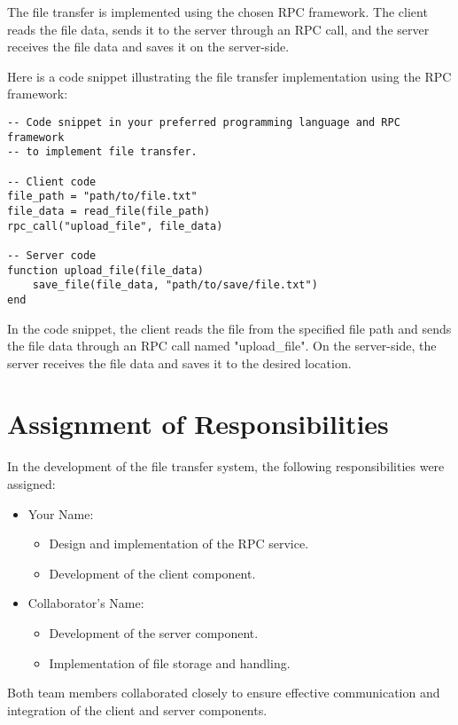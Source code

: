 \documentclass{article}
\begin{document}
The file transfer is implemented using the chosen RPC framework. The client reads the file data, sends it to the server through an RPC call, and the server receives the file data and saves it on the server-side.

Here is a code snippet illustrating the file transfer implementation using the RPC framework:

\begin{verbatim}
-- Code snippet in your preferred programming language and RPC framework
-- to implement file transfer.

-- Client code
file_path = "path/to/file.txt"
file_data = read_file(file_path)
rpc_call("upload_file", file_data)

-- Server code
function upload_file(file_data)
    save_file(file_data, "path/to/save/file.txt")
end
\end{verbatim}

In the code snippet, the client reads the file from the specified file path and sends the file data through an RPC call named "upload_file". On the server-side, the server receives the file data and saves it to the desired location.

\section{Assignment of Responsibilities}

In the development of the file transfer system, the following responsibilities were assigned:

\begin{itemize}
  \item Your Name:
  \begin{itemize}
    \item Design and implementation of the RPC service.
    \item Development of the client component.
  \end{itemize}
  \item Collaborator's Name:
  \begin{itemize}
    \item Development of the server component.
    \item Implementation of file storage and handling.
  \end{itemize}
\end{itemize}

Both team members collaborated closely to ensure effective communication and integration of the client and server components.
\end{document}
